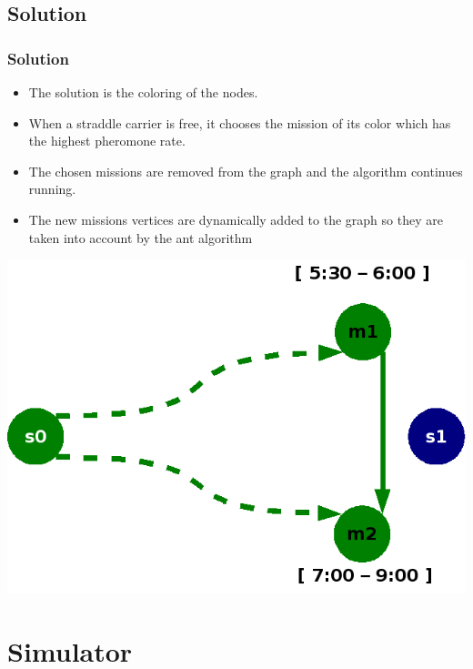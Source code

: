 \documentclass{beamer}
\begin{document}
\subsection*{Solution}
\begin{frame}
\frametitle{Solution}

	\begin{itemize}
	  \item The solution is the coloring of the nodes.
	  \item When a straddle carrier is free, it chooses the mission of its color which has the highest pheromone rate.
	  \item The chosen missions are removed from the graph and the algorithm continues running.
	  \item The new missions vertices are dynamically added to the graph so they are taken into account by the ant algorithm
	\end{itemize}
	
	\begin{center}
		\includegraphics[height=.40\textheight]{fig/missionGraphWith2NodesRemoved.png}
	\end{center}
\end{frame}

\section{Simulator}
\end{document}
